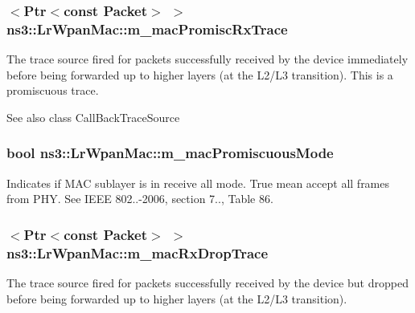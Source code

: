 \subsubsection[{\texorpdfstring{m\+\_\+mac\+Promisc\+Rx\+Trace}{m_macPromiscRxTrace}}]{$<${\bf Ptr}$<$const {\bf Packet}$>$ $>$ ns3\+::\+Lr\+Wpan\+Mac\+::m\+\_\+mac\+Promisc\+Rx\+Trace\hspace{0.3cm}{\ttfamily [private]}}\hypertarget{classns3_1_1LrWpanMac_af05f835a006d0fa06af15d1d504219a4}{}\label{classns3_1_1LrWpanMac_af05f835a006d0fa06af15d1d504219a4}
The trace source fired for packets successfully received by the device immediately before being forwarded up to higher layers (at the L2/\+L3 transition). This is a promiscuous trace.

\begin{DoxySeeAlso}{See also}
class Call\+Back\+Trace\+Source 
\end{DoxySeeAlso}
\subsubsection[{\texorpdfstring{m\+\_\+mac\+Promiscuous\+Mode}{m_macPromiscuousMode}}]{\setlength{\rightskip}{0pt plus 5cm}bool ns3\+::\+Lr\+Wpan\+Mac\+::m\+\_\+mac\+Promiscuous\+Mode}\hypertarget{classns3_1_1LrWpanMac_aaf3802d8a9c98323a662b4e8209144e4}{}\label{classns3_1_1LrWpanMac_aaf3802d8a9c98323a662b4e8209144e4}
Indicates if M\+AC sublayer is in receive all mode. True mean accept all frames from P\+HY. See I\+E\+EE 802..-\/2006, section 7.., Table 86. 
\subsubsection[{\texorpdfstring{m\+\_\+mac\+Rx\+Drop\+Trace}{m_macRxDropTrace}}]{$<${\bf Ptr}$<$const {\bf Packet}$>$ $>$ ns3\+::\+Lr\+Wpan\+Mac\+::m\+\_\+mac\+Rx\+Drop\+Trace\hspace{0.3cm}{\ttfamily [private]}}\hypertarget{classns3_1_1LrWpanMac_ac06545ba350f6e2bc5d771213875bdf6}{}\label{classns3_1_1LrWpanMac_ac06545ba350f6e2bc5d771213875bdf6}
The trace source fired for packets successfully received by the device but dropped before being forwarded up to higher layers (at the L2/\+L3 transition).

